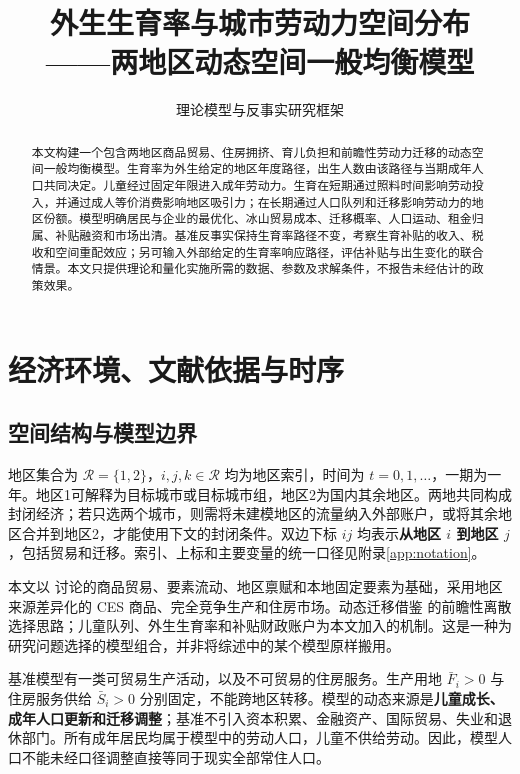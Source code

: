 \documentclass[UTF8,a4paper,zihao=-4,fontset=windows]{ctexart}
\title{外生生育率与城市劳动力空间分布\\
  ——两地区动态空间一般均衡模型}
\author{理论模型与反事实研究框架}
\date{}
\numberwithin{equation}{section}
\begin{document}
\maketitle

\begin{abstract}
本文构建一个包含两地区商品贸易、住房拥挤、育儿负担和前瞻性劳动力迁移的动态空间一般均衡模型。生育率为外生给定的地区年度路径，出生人数由该路径与当期成年人口共同决定。儿童经过固定年限进入成年劳动力。生育在短期通过照料时间影响劳动投入，并通过成人等价消费影响地区吸引力；在长期通过人口队列和迁移影响劳动力的地区份额。模型明确居民与企业的最优化、冰山贸易成本、迁移概率、人口运动、租金归属、补贴融资和市场出清。基准反事实保持生育率路径不变，考察生育补贴的收入、税收和空间重配效应；另可输入外部给定的生育率响应路径，评估补贴与出生变化的联合情景。本文只提供理论和量化实施所需的数据、参数及求解条件，不报告未经估计的政策效果。
\end{abstract}
\tableofcontents
\newpage

\section{经济环境、文献依据与时序}
\label{sec:environment}

\subsection{空间结构与模型边界}
地区集合为 $\mathcal R=\{1,2\}$，$i,j,k\in\mathcal R$ 均为地区索引，时间为 $t=0,1,\ldots$，一期为一年。地区1可解释为目标城市或目标城市组，地区2为国内其余地区。两地共同构成封闭经济；若只选两个城市，则需将未建模地区的流量纳入外部账户，或将其余地区合并到地区2，才能使用下文的封闭条件。双边下标 $ij$ 均表示\textbf{从地区 $i$ 到地区 $j$}，包括贸易和迁移。索引、上标和主要变量的统一口径见附录\ref{app:notation}。

本文以 \citet{redding2017quantitative} 讨论的商品贸易、要素流动、地区禀赋和本地固定要素为基础，采用地区来源差异化的 CES 商品、完全竞争生产和住房市场。动态迁移借鉴 \citet{kleinman2023dynamic} 的前瞻性离散选择思路；儿童队列、外生生育率和补贴财政账户为本文加入的机制。这是一种为研究问题选择的模型组合，并非将综述中的某个模型原样搬用。

基准模型有一类可贸易生产活动，以及不可贸易的住房服务。生产用地 $\bar F_i>0$ 与住房服务供给 $\bar S_i>0$ 分别固定，不能跨地区转移。模型的动态来源是\textbf{儿童成长、成年人口更新和迁移调整}；基准不引入资本积累、金融资产、国际贸易、失业和退休部门。所有成年居民均属于模型中的劳动人口，儿童不供给劳动。因此，模型人口不能未经口径调整直接等同于现实全部常住人口。
\end{document}
